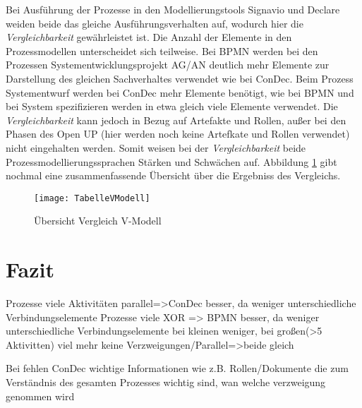 Bei Ausführung der Prozesse in den Modellierungstools Signavio und Declare weiden beide das gleiche Ausführungsverhalten auf, wodurch hier die \textit{Vergleichbarkeit} gewährleistet ist. \newline
Die Anzahl der Elemente in den Prozessmodellen unterscheidet sich teilweise. Bei BPMN werden bei den Prozessen Systementwicklungsprojekt AG/AN deutlich mehr Elemente zur Darstellung des gleichen Sachverhaltes verwendet wie bei ConDec. Beim Prozess Systementwurf werden bei ConDec mehr Elemente benötigt, wie bei BPMN und bei System spezifizieren werden in etwa gleich viele Elemente verwendet.\newline
Die \textit{Vergleichbarkeit} kann jedoch in Bezug auf Artefakte und Rollen, außer bei den Phasen des Open UP (hier werden noch keine Artefkate und Rollen verwendet) nicht eingehalten werden.\newline
Somit weisen bei der \textit{Vergleichbarkeit} beide Prozessmodellierungssprachen Stärken und Schwächen auf. \newline
Abbildung \ref{fig:TabelleVModell} gibt nochmal eine zusammenfassende Übersicht über die Ergebniss des Vergleichs. 


\begin{figure}[!htbp]
\begin{center}
  \texttt{[image: TabelleVModell]} %
  \caption{Übersicht Vergleich V-Modell}
  \label{fig:TabelleVModell}
\end{center}
\end{figure}




\section{Fazit}

Prozesse viele Aktivitäten parallel=>ConDec besser, da weniger unterschiedliche Verbindungselemente
Prozesse viele XOR => BPMN besser, da weniger unterschiedliche Verbindungselemente bei kleinen weniger, bei großen(>5 Aktivitten) viel mehr
keine Verzweigungen/Parallel=>beide gleich


Bei fehlen ConDec wichtige Informationen wie z.B. Rollen/Dokumente die zum Verständnis des gesamten Prozesses wichtig sind, wan welche verzweigung genommen wird 





